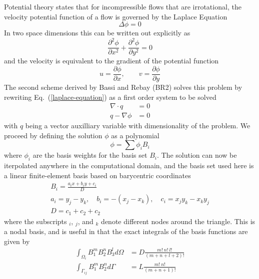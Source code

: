 \documentclass[a4paper]{report}
\newcommand{\eref}[1]{Eq.~(\ref{#1})}
\newcommand{\dint}[1]{\int_{\Omega_i}{#1 d\Omega}}
\newcommand{\sint}[1]{\int_{\Gamma_{ij}}{#1 d\Gamma}}
\begin{document}
Potential theory states that for incompressible flows that are irrotational, the
velocity potential function of a flow is governed by the Laplace Equation
\begin{equation}
  \Delta \phi = 0
  \label{laplace-equation}
\end{equation}
In two space dimensions this can be written out explicitly as
\begin{equation}
  \frac{\partial^2 \phi}{\partial x^2} 
  + \frac{\partial^2 \phi}{\partial y^2} = 0
  \label{2d-laplace}
\end{equation}
and the velocity is equivalent to the gradient of the potential function
\begin{equation}
  u = \frac{\partial \phi}{\partial x}, \qquad v = \frac{\partial \phi}{\partial y}
  \label{uv-def}
\end{equation}
The second scheme derived by Bassi and Rebay (BR2) solves this problem by
rewriting \eref{laplace-equation} as a first order system to be solved 
\begin{align}
  \nabla \cdot q &= 0 \\
  q - \nabla \phi &= 0
  \label{first-order-sys}
\end{align}
with $q$ being a vector auxilliary variable with dimensionality of the problem.
We proceed by defining the solution $\phi$ as a polynomial \begin{equation}
  \phi = \sum{\phi_i B_i}
  \label{fem-soln}
\end{equation}
where $\phi_i$ are the basis weights for the basis set $B_i$.  The solution can
now be iterpolated anywhere in the computational domain, and the basis set used
here is a linear finite-element basis based on barycentric coordinates
\begin{equation}
  \begin{gathered}
    B_i = \frac{a_i x + b_i y + c_i}{D} \\
    a_i = y_j-y_k, \quad 
    b_i = -(x_j - x_k), \quad
    c_i = x_j y_k - x_k y_j  \\
    D = c_1 + c_2 + c_2
  \end{gathered}
  \label{basis}
\end{equation}
where the subscripts $_i$, $_j$, and $_k$ denote different nodes around the
triangle. This is a nodal basis, and is useful in that the exact integrals of
the basis functions are given by
\begin{align}
  \dint{B_1^{m}B_2^{n}B_3^{l}} &= D \frac{m!\ n!\ l!}{(m+n+l+2)!}
  \label{dom-integral-def} \\
  \sint{B_1^{m}B_2^{n}} &= L \frac{m!\ n!}{(m+n+1)!}
  \label{edge-integral-def}
\end{align}
\end{document}
